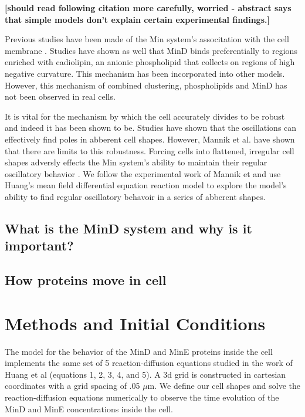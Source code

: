 \documentclass[letterpaper,twocolumn,amsmath,amssymb,pre]{revtex4-1}
\newcommand{\red}[1]{{\bf \color{red} #1}}
\newcommand{\fixme}[1]{\red{[#1]}}
\begin{document}
\fixme{should read following citation more carefully, worried -
  abstract says that simple models don't explain certain experimental
  findings.} \cite{ivanov2010multiple}


Previous studies have been made of the Min system's associtation with
the cell membrane
\cite{hsieh2010direct}\cite{mileykovskaya2003effects}.  Studies have
shown as well that MinD binds preferentially to regions enriched with
cadiolipin, an anionic phospholipid that collects on regions of high
negative curvature. This mechanism has been incorporated into other
models.\cite{drew2005polymerization}
\cite{cytrynbaum2007multistranded} \cite{renner2012mind}
\cite{renner2012mind} However, this mechanism of combined clustering,
phospholipids and MinD has not been observed in real
cells. \cite{halatek2012highly}

It is vital for the mechanism by which the cell accurately divides to
be robust and indeed it has been shown to
be\cite{touhami2006temperature}.  Studies have shown that the
oscillations can effectively find poles in abberent cell
shapes\cite{varma2008min}\cite{juarez2010changes}.  However, Mannik et
al. have shown that there are limits to this robustness. Forcing cells
into flattened, irregular cell shapes adversly effects the Min
system's ability to maintain their regular oscillatory
behavior\cite{mannik2012robustness} \cite{mannik2010bacteria} \cite{mannik2009bacterial}.  We
follow the experimental work of Mannik et and use Huang's mean field
differential equation reaction model to explore the model's ability to
find regular oscillatory behavoir in a series of abberent shapes.



\subsection{What is the MinD system and why is it important?}
\subsection{How proteins move in cell}
\section{Methods and Initial Conditions}
The model for the behavior of the MinD and MinE proteins inside the
cell implements the same set of 5 reaction-diffusion equations studied in
the work of Huang et al (equations 1, 2, 3, 4, and
5)\cite{huang2003dynamic}. A 3d grid is constructed in cartesian
coordinates with a grid spacing of .05 $\mu$m. We define our cell
shapes and solve the reaction-diffusion equations numerically to
observe the time evolution of the MinD and MinE concentrations inside
the cell.
\end{document}
